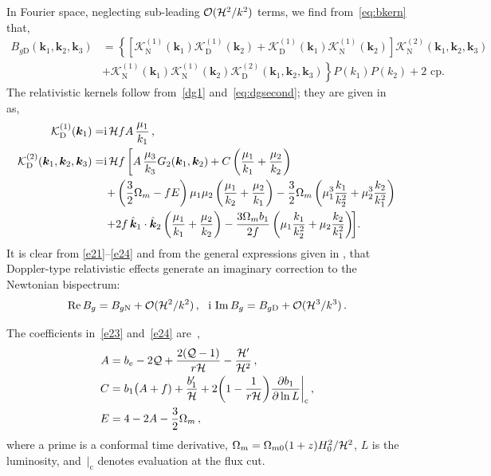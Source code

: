 In Fourier space, neglecting sub-leading $ \mathcal{O}(\mathcal{H}^2/k^2)$ terms, we find from~\eqref{eq:bkern} that,
\begin{align}
 B_{g\mathrm{D}}(\bm{k}_{1},\bm{k}_{2},\bm{k}_{3}) &=  \left\{\left[\mathcal{K}^{(1)}_{\mathrm{N}}(\bm{k}_{1})\mathcal{K}^{(1)}_{\mathrm{D}}(\bm{k}_{2}) + \mathcal{K}^{(1)}_{\mathrm{D}}(\bm{k}_{1})\mathcal{K}^{(1)}_{\mathrm{N}}(\bm{k}_{2})\right]\mathcal{K}^{(2)}_{\mathrm{N}}(\bm{k}_{1},\bm{k}_{2},\bm{k}_{3}) \right. \nonumber \\
& \left. +\mathcal{K}^{(1)}_{\mathrm{N}}(\bm{k}_{1})\mathcal{K}^{(1)}_{\mathrm{N}}(\bm{k}_{2})\mathcal{K}^{(2)}_{\mathrm{D}}(\bm{k}_{1},\bm{k}_{2},\bm{k}_{3})\right\}P(k_{1})P(k_{2})+\text{2 cp}. \label{e21}
\end{align}
The relativistic kernels follow from~\eqref{dg1} and~\eqref{eq:dgsecond}; they are given in~\cite{Clarkson:2018dwn} as,
\begin{align}
\mathcal{K}^{(1)}_{\mathrm{D}}(\bm{k}_{1}) =& \mathrm{i}\,\mathcal{H} f A\,\frac{\mu_{1}}{k_{1}}\,, \label{e23} \\
\mathcal{K}^{(2)}_{\mathrm{D}}(\bm{k}_{1},\bm{k}_{2},\bm{k}_{3}) =& \mathrm{i}\,\mathcal{H} f \left[
A\,\frac{\mu_{3}}{k_{3}}G_{2}(\bm{k}_{1},\bm{k}_{2})
+C\left(\frac{\mu_{1}}{k_{1}} + \frac{\mu_{2}}{k_{2}}\right) \right. \nonumber \\
&\left.  +\left(\frac{3}{2}\Omega_{m}-fE\right)\mu_{1}\mu_{2}\left(\frac{\mu_{1}}{k_{2}}+\frac{\mu_{2}}{k_{1}}\right)  -\frac{3}{2}\Omega_{m}\left(\mu_{1}^{3}\frac{k_{1}}{k_{2}^{2}} + \mu_{2}^{3}\frac{k_{2}}{k_{1}^{2}}\right) \right. \nonumber \\
&\left. +2f\,  {\hat{\bm{k}}_{1} \cdot \hat{\bm{k}}_2}\left(\frac{\mu_{1}}{k_{1}} + \frac{\mu_{2}}{k_{2}}\right) 
 -\frac{3\Omega_{m}b_1}{2f}\left(\mu_{1}\frac{k_{1}}{k_{2}^{2}} + \mu_{2}\frac{k_{2}}{k_{1}^{2}}\right)\!  \right]\! .~~~ \label{e24}
\end{align}
It is clear from \eqref{e21}--\eqref{e24} and from the general expressions given in {\cite{Umeh:2016nuh,Jolicoeur:2017nyt}}, that Doppler-type relativistic effects generate an imaginary correction to the Newtonian bispectrum: 
\begin{equation}
{{\mathrm{Re}}\, B_g =B_{g\mathrm{N}} + \mathcal{O}(\mathcal{H}^2/k^2)\,,~~ {\mathrm{i\,}}\, {\mathrm{Im}}\, B_g = B_{g\mathrm{D}}+ \mathcal{O}(\mathcal{H}^3/k^3)}\,. \label{bgnd}
\end{equation}

The  coefficients in~\eqref{e23} and~\eqref{e24} are~\cite{Clarkson:2018dwn},
\begin{align}
A &= b_{e} - 2\mathcal{Q} + \frac{2(\mathcal{Q}-1)}{{r} \mathcal{H}}
 - \frac{\mathcal{H}'}{\mathcal{H}^{2}} \label{e25} \,, \\
C &= b_{1}\big(A+f) + \frac{b_1'}{\mathcal{H}} + 2\bigg(1-\frac{1}{{r} \mathcal{H}}\bigg){\frac{\partial b_1}{\partial \ln{L}}\bigg|_{\mathrm{c}}} \label{e26}\,, \\
E &= 4-2A-\frac{3}{2}\Omega_{m} \label{e27} \,,
\end{align}
where a prime is a conformal time derivative, $\Omega_m=\Omega_{m0}(1+z)H_0^2/\mathcal{H}^2$,  $L$ is the  luminosity, and $\,|_{\mathrm{c}}$ denotes evaluation at the flux cut. 

